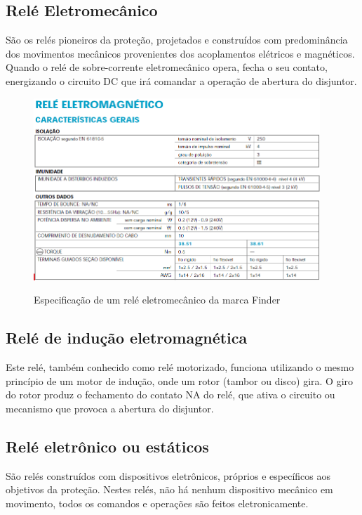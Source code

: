 \documentclass[a5paper,english,spanish,brazil]{ufsc-thesis}
\begin{document}
\subsection{Relé Eletromecânico}
São os relés pioneiros da proteção, projetados e construídos com predominância dos movimentos mecânicos provenientes dos acoplamentos elétricos e magnéticos. Quando o relé de sobre-corrente eletromecânico opera, fecha o seu contato, energizando o circuito DC que irá comandar a operação de abertura do disjuntor.\par

\begin{figure}[htb]
  \caption{Especificação de um relé eletromecânico da marca Finder}
  \centering
  \includegraphics[width=10.8cm]{eletromag.jpg}
  \label{fig:eletromag}
\end{figure}

\subsection{Relé de indução eletromagnética}
Este relé, também conhecido como relé motorizado, funciona utilizando o mesmo princípio de um motor de indução, onde um rotor (tambor ou disco) gira. O giro do rotor produz o fechamento do contato NA do relé, que ativa o circuito ou mecanismo que provoca a abertura do disjuntor.\par

\subsection{Relé eletrônico ou estáticos}
São relés construídos com dispositivos eletrônicos, próprios e específicos aos objetivos da proteção. Nestes relés, não há nenhum dispositivo mecânico em movimento, todos os comandos e operações são feitos eletronicamente.\par
\end{document}
